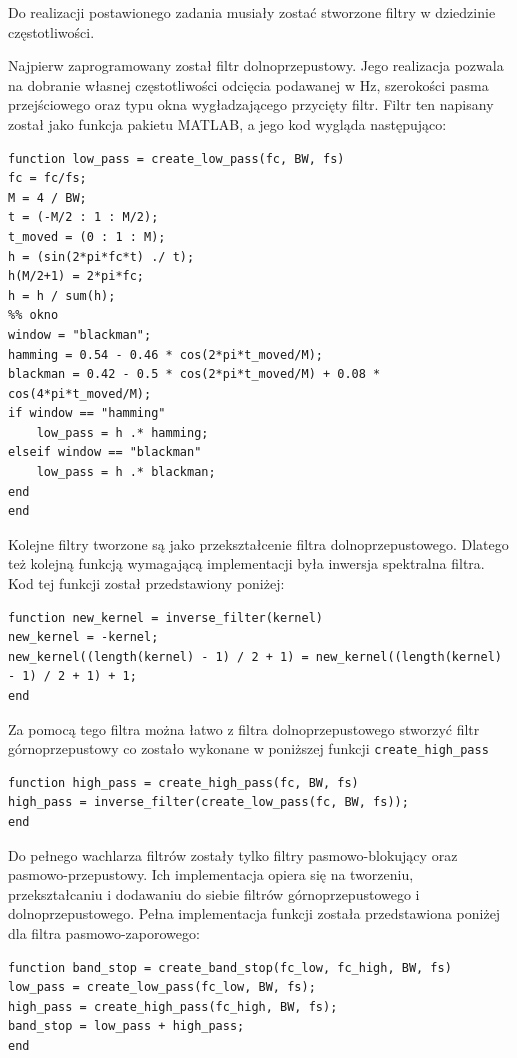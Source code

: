 Do realizacji postawionego zadania musiały zostać stworzone filtry w dziedzinie częstotliwości.

Najpierw zaprogramowany został filtr dolnoprzepustowy.
Jego realizacja pozwala na dobranie własnej częstotliwości odcięcia podawanej w Hz, szerokości pasma przejściowego oraz typu okna wygładzającego przycięty filtr.
Filtr ten napisany został jako funkcja pakietu MATLAB, a jego kod wygląda następująco:

\begin{lstlisting}[style=Matlab-editor]
function low_pass = create_low_pass(fc, BW, fs)
fc = fc/fs;
M = 4 / BW;
t = (-M/2 : 1 : M/2);
t_moved = (0 : 1 : M);
h = (sin(2*pi*fc*t) ./ t);
h(M/2+1) = 2*pi*fc;
h = h / sum(h);
%% okno
window = "blackman";
hamming = 0.54 - 0.46 * cos(2*pi*t_moved/M);
blackman = 0.42 - 0.5 * cos(2*pi*t_moved/M) + 0.08 * cos(4*pi*t_moved/M);
if window == "hamming"
	low_pass = h .* hamming;
elseif window == "blackman"
	low_pass = h .* blackman;
end
end
\end{lstlisting}

Kolejne filtry tworzone są jako przekształcenie filtra dolnoprzepustowego.
Dlatego też kolejną funkcją wymagającą implementacji była inwersja spektralna filtra.
Kod tej funkcji został przedstawiony poniżej:

\begin{lstlisting}[style=Matlab-editor]
function new_kernel = inverse_filter(kernel)
new_kernel = -kernel;
new_kernel((length(kernel) - 1) / 2 + 1) = new_kernel((length(kernel) - 1) / 2 + 1) + 1;
end
\end{lstlisting}

Za pomocą tego filtra można łatwo z filtra dolnoprzepustowego stworzyć filtr górnoprzepustowy co zostało wykonane w poniższej funkcji \verb|create_high_pass|

\begin{lstlisting}[style=Matlab-editor]
function high_pass = create_high_pass(fc, BW, fs)
high_pass = inverse_filter(create_low_pass(fc, BW, fs));
end
\end{lstlisting}

Do pełnego wachlarza filtrów zostały tylko filtry pasmowo-blokujący oraz pasmowo-przepustowy.
Ich implementacja opiera się na tworzeniu, przekształcaniu i dodawaniu do siebie filtrów górnoprzepustowego i dolnoprzepustowego.
Pełna implementacja funkcji została przedstawiona poniżej dla filtra pasmowo-zaporowego:

\begin{lstlisting}[style=Matlab-editor]
function band_stop = create_band_stop(fc_low, fc_high, BW, fs)
low_pass = create_low_pass(fc_low, BW, fs);
high_pass = create_high_pass(fc_high, BW, fs);
band_stop = low_pass + high_pass;
end
\end{lstlisting}

